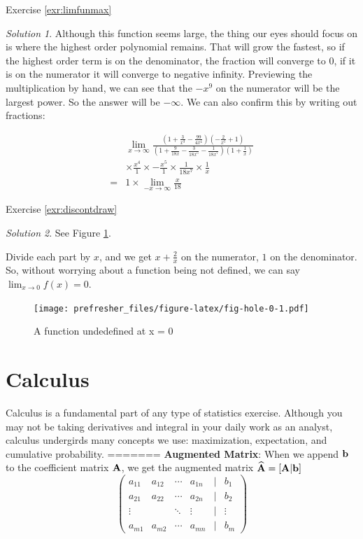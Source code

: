 \documentclass[]{book}
\theoremstyle{definition}
\theoremstyle{definition}
\theoremstyle{definition}
\theoremstyle{remark}
\newtheorem*{solution}{Solution}
\begin{document}
Exercise \ref{exr:limfunmax}

\begin{solution}
{}Although this function seems large, the thing our eyes should focus on is where the highest order polynomial remains. That will grow the fastest, so if the highest order term is on the denominator, the fraction will converge to 0, if it is on the numerator it will converge to negative infinity. Previewing the multiplication by hand, we can see that the \(-x^9\) on the numerator will be the largest power. So the answer will be \(-\infty\). We can also confirm this by writing out fractions:

\begin{align*}  
& \lim_{x\to\infty}\frac{\left(1 + \frac{3}{x^3} - \frac{99}{4x^4}\right)\left(-\frac{2}{x^5} + 1\right)}{\left(1 + \frac{9}{18x} - \frac{3}{18x^5} - \frac{1}{18x^7} \right)\left(1 + \frac{1}{x}\right)} \\
&\times \frac{x^4}{1} \times -\frac{x^5}{1} \times \frac{1}{18x^7}\times \frac{1}{x}\\
=& 1 \times \lim_{-x\to\infty} \frac{x}{18}
\end{align*}
\end{solution}

Exercise \ref{exr:discontdraw}

\begin{solution}
{}
See Figure \ref{fig:fig-hole-0}.

Divide each part by \(x\), and we get \(x + \frac{2}{x}\) on the numerator, \(1\) on the denominator. So, without worrying about a function being not defined, we can say \(\lim_{x\to 0}f(x) = 0\).
\end{solution}

\begin{figure}
\centering
\texttt{[image: prefresher\_files/figure-latex/fig-hole-0-1.pdf]}
\caption{\label{fig:fig-hole-0}A function undedefined at x = 0}
\end{figure}

\hypertarget{derivatives}{%
\chapter{Calculus}\label{derivatives}}

Calculus is a fundamental part of any type of statistics exercise. Although you may not be taking derivatives and integral in your daily work as an analyst, calculus undergirds many concepts we use: maximization, expectation, and cumulative probability.
=======
\textbf{Augmented Matrix}: When we append \(\bf b\) to the coefficient matrix \(\bf A\), we get the augmented matrix \(\widehat{\bf A}=[\bf A | b]\)
\[\begin{pmatrix}
            a_{11} & a_{12} & \cdots & a_{1n} & | & b_1\\
            a_{21} & a_{22} & \cdots & a_{2n} & | & b_2\\
            \vdots &  & \ddots & \vdots & | & \vdots\\
            a_{m1} & a_{m2} & \cdots & a_{mn} & | & b_m
            \end{pmatrix}\]
\end{document}
